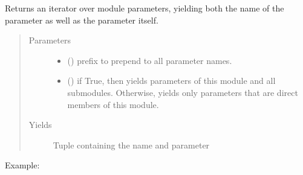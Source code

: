 \documentclass[letterpaper,10pt,english]{sphinxmanual}
\begin{document}
\begin{fulllineitems}
\begin{fulllineitems}
\end{fulllineitems}


\begin{fulllineitems}
\label{\detokenize{api/autoencoding:geology.metamodelling.SpatialAutoencoder.named_parameters}}
Returns an iterator over module parameters, yielding both the
name of the parameter as well as the parameter itself.
\begin{quote}\begin{description}
\item[{Parameters}] \leavevmode\begin{itemize}
\item {} 
 () \textendash{} prefix to prepend to all parameter names.

\item {} 
 () \textendash{} if True, then yields parameters of this module
and all submodules. Otherwise, yields only parameters that
are direct members of this module.

\end{itemize}

\item[{Yields}] \leavevmode
{} \textendash{} Tuple containing the name and parameter

\end{description}\end{quote}

Example:

\begin{sphinxVerbatim}[commandchars=\\\{\}]
    
      \PYG{p}{[}\PYG{p}{]}
       
\end{sphinxVerbatim}


\end{fulllineitems}
\end{fulllineitems}
\end{document}
